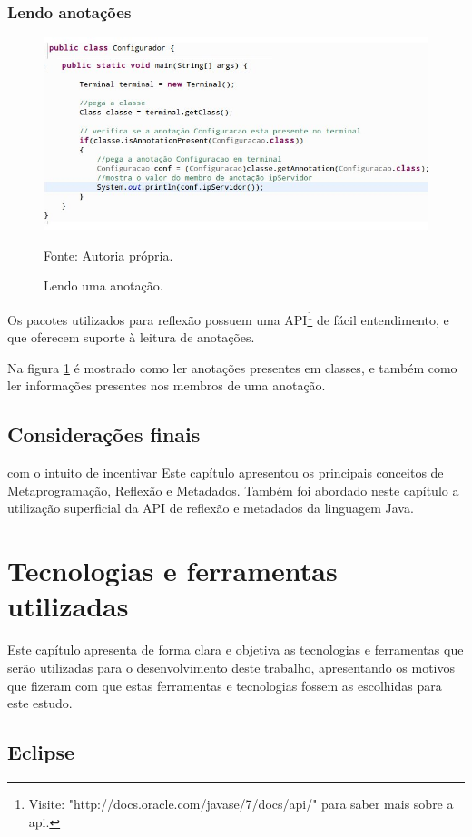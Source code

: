 \documentclass[tc,openright]{iiufrgs}
\begin{document}
\subsection{Lendo anotações}
\begin{figure}[ht]
	\centering
	\includegraphics[scale=0.5]{figuras/lendoAnnotation.jpg}
	\caption{Lendo uma anotação.}
	\small{Fonte: Autoria própria.}
	\label{fig:lendoAnotacao}
\end{figure}
Os pacotes utilizados para reflexão possuem uma API\footnote{Visite: "http://docs.oracle.com/javase/7/docs/api/"  para saber mais sobre a api.} de fácil entendimento, e que oferecem suporte à leitura de anotações.

Na figura \ref{fig:lendoAnotacao} é mostrado como ler anotações presentes em classes, e também como ler informações presentes nos membros de uma anotação.

\section{Considerações finais}
 com o intuito de incentivar
Este capítulo apresentou os principais conceitos de Metaprogramação, Reflexão e Metadados. Também foi abordado neste capítulo a utilização superficial da API de reflexão e metadados da linguagem Java. 

\chapter{Tecnologias e ferramentas utilizadas}
Este capítulo apresenta  de forma clara e objetiva as tecnologias e ferramentas que serão utilizadas para o desenvolvimento deste trabalho, apresentando os motivos que fizeram com que estas ferramentas e tecnologias fossem as escolhidas para este estudo.

\section{Eclipse}
\end{document}
